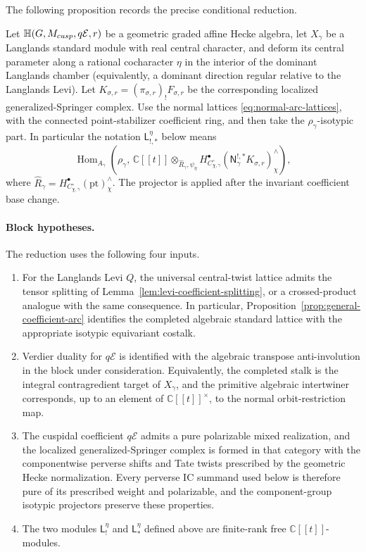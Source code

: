 \documentclass[10pt,a4paper]{amsart}
\begin{document}
The following proposition records the precise conditional reduction.

Let $\mathbb H(G,M_{\rm cusp},q\mathcal E,r)$ be a geometric graded affine
Hecke algebra, let $X_\gamma$ be a Langlands standard module with real central
character, and deform its central parameter along a rational cocharacter
$\eta$ in the interior of the dominant Langlands chamber (equivalently, a
dominant direction regular relative to the Langlands Levi).  Let
$K_{\sigma,r}=(\pi_{\sigma,r})_!F_{\sigma,r}$ be the corresponding localized
generalized-Springer complex.  Use the normal lattices \eqref{eq:normal-arc-lattices}, with the
connected point-stabilizer coefficient ring, and then take the
$\rho_\gamma$-isotypic part.  In particular the notation
$\mathsf L_{!,*}^{\eta}$ below means
\[
 \operatorname{Hom}_{A_\gamma}\!\left(\rho_\gamma,\,
 \mathbb C[[t]]\otimes_{\widehat R_\gamma,\psi_\eta}
 H_{C_{\chi,\gamma}^\circ}^{\bullet}
       (\mathsf N_\gamma^{!,*}K_{\sigma,r})^\wedge_\chi\right),
\]
where $\widehat R_\gamma
=H_{C_{\chi,\gamma}^\circ}^{\bullet}(\mathrm{pt})^\wedge_\chi$.
The projector is applied after the invariant coefficient base change.

\paragraph{Block hypotheses.}
The reduction uses the following four inputs.
\begin{enumerate}[leftmargin=3.2em]
\item[\textup{(U1)}] For the Langlands Levi $Q$, the universal central-twist lattice admits
the tensor splitting of Lemma~\ref{lem:levi-coefficient-splitting}, or a
crossed-product analogue with the same consequence.  In particular,
Proposition~\ref{prop:general-coefficient-arc} identifies the completed
algebraic standard lattice with the appropriate isotypic equivariant
costalk.
\item[\textup{(U2)}] Verdier duality for $q\mathcal E$ is identified with the algebraic
transpose anti-involution in the block under consideration.  Equivalently,
the completed stalk is the integral contragredient target of $X_\gamma$, and
the primitive algebraic intertwiner corresponds, up to an element of
$\mathbb C[[t]]^\times$, to the normal orbit-restriction map.
\item[\textup{(U3a)}] The cuspidal coefficient $q\mathcal E$ admits a pure
polarizable mixed realization, and the localized generalized-Springer
complex is formed in that category with the componentwise perverse shifts and
Tate twists prescribed by the geometric Hecke normalization.  Every
perverse IC summand used below is therefore pure of its prescribed weight
and polarizable, and the component-group isotypic projectors preserve these
properties.
\item[\textup{(U3b)}] The two modules $\mathsf L_!^\eta$ and
$\mathsf L_*^\eta$ defined above are finite-rank free
$\mathbb C[[t]]$-modules.
\end{enumerate}
\end{document}
